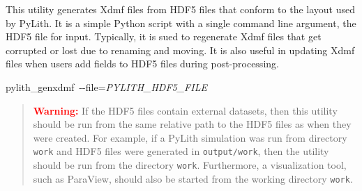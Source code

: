 This utility generates Xdmf files from HDF5 files that conform to
the layout used by PyLith. It is a simple Python script with a single
command line argument, the HDF5 file for input. Typically, it is sued
to regenerate Xdmf files that get corrupted or lost due to renaming
and moving. It is also useful in updating Xdmf files when users add
fields to HDF5 files during post-processing.
\begin{lyxcode}
pylith\_genxdmf~-{}-file=\textit{PYLITH\_HDF5\_FILE}\end{lyxcode}
\begin{quote}
\textbf{\textcolor{red}{Warning:}}\textbf{ }If the HDF5 files contain
external datasets, then this utility should be run from the same relative
path to the HDF5 files as when they were created. For example, if
a PyLith simulation was run from directory \texttt{work} and HDF5
files were generated in \texttt{output/work}, then the utility should
be run from the directory \texttt{work}. Furthermore, a visualization
tool, such as ParaView, should also be started from the working directory
\texttt{work}.\end{quote}

